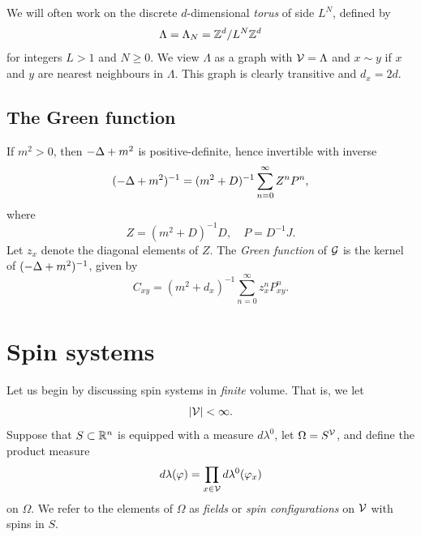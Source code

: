 \begin{example}
We will often work on the discrete $d$-dimensional \emph{torus}
of side $L^N$, defined by
\begin{equation}
\label{e:Lambda-torus}
\Lambda = \Lambda_N = { {{\mathbb Z}}^d }/L^N{ {{\mathbb Z}}^d }
\end{equation}
for integers $L > 1$ and $N \ge 0$.
We view $\Lambda$ as a graph with $\mathcal{V} = \Lambda$ and $x \sim y$ if
$x$ and $y$ are nearest neighbours in $\Lambda$. This graph is clearly transitive
and $d_x = 2d$.
\end{example}


\subsection{The Green function}

If $m^2 > 0$, then $-\Delta + m^2$ is positive-definite, hence invertible with inverse
\begin{equation}
(-\Delta + m^2)^{-1} = (m^2 + D)^{-1} \sum_{n=0}^\infty Z^n P^n,
\end{equation}
where
\begin{equation}
Z = (m^2 + D)^{-1} D,
  \quad
P = D^{-1} J.
\end{equation}
Let $z_x$ denote the diagonal elements of $Z$. The \emph{Green function}
of $\mathcal{G}$ is the kernel of $(-\Delta + m^2)^{-1}$, given by
\begin{equation}
\label{e:greendef}
C_{xy}
  =
(m^2 + d_x)^{-1} \sum_{n=0}^\infty z_x^n P^n_{xy}.
\end{equation}


\section{Spin systems}
\label{sec:spins}

Let us begin by discussing spin systems in \emph{finite} volume. That is, we let
\begin{equation}
|\mathcal{V}| < \infty.
\end{equation}
Suppose that $S \subset {\mathbb R}^n$ is equipped with a measure $d\lambda^0$, let
$\Omega = S^{\mathcal{V}}$, and define the product measure
\begin{equation}
d\lambda(\varphi) = \prod_{x\in\mathcal{V}} d\lambda^0(\varphi_x)
\end{equation}
on $\Omega$. We refer to the elements of $\Omega$ as \emph{fields}
or \emph{spin configurations} on $\mathcal{V}$ with spins in $S$.

